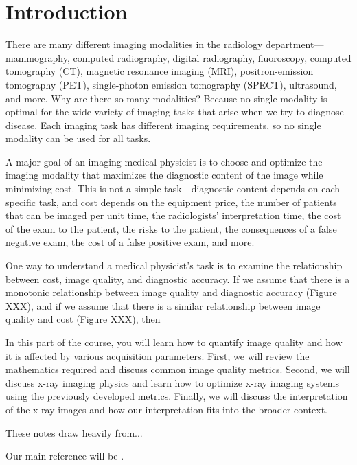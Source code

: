 \documentclass[mphy386-notes.tex]{subfiles}
\begin{document}
\section{Introduction}
There are many different imaging modalities in the radiology department---
mammography, computed radiography, digital radiography, fluoroscopy, computed
tomography (CT), magnetic resonance imaging (MRI), positron-emission tomography
(PET), single-photon emission tomography (SPECT), ultrasound, and more. Why are
there so many modalities? Because no single modality is optimal for the
wide variety of imaging tasks that arise when we try to diagnose disease. Each
imaging task has different imaging requirements, so no single modality can be
used for all tasks.

A major goal of an imaging medical physicist is to choose and optimize the
imaging modality that maximizes the diagnostic content of the image while
minimizing cost. This is not a simple task---diagnostic content depends on each
specific task, and cost depends on the equipment price, the number of patients
that can be imaged per unit time, the radiologists’ interpretation time, the
cost of the exam to the patient, the risks to the patient, the consequences of a
false negative exam, the cost of a false positive exam, and more.

One way to understand a medical physicist's task is to examine the relationship
between cost, image quality, and diagnostic accuracy. If we assume that there is
a monotonic relationship between image quality and diagnostic accuracy (Figure
XXX), and if we assume that there is a similar relationship between image
quality and cost (Figure XXX), then 

In this part of the course, you will learn how to quantify image quality and how
it is affected by various acquisition parameters. First, we will review the mathematics required and
discuss common image quality metrics. Second, we will discuss x-ray imaging
physics and learn how to optimize x-ray imaging systems using the previously
developed metrics. Finally, we will discuss the interpretation of the x-ray images
and how our interpretation fits into the broader context. 

These notes draw heavily from...

Our main reference will be \cite{barrett}. 
\pagebreak
\end{document}

